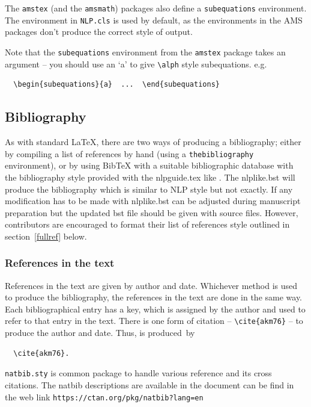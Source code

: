 \documentclass{CUP-JNL-NLP}
\begin{document}
The \verb"amstex" (and the \verb"amsmath") packages also define a
\verb"subequations" environment.  The environment in \verb"NLP.cls" is used
by default, as the environments in the AMS packages don't produce the correct
style of output.

Note that the \verb"subequations" environment from the \verb"amstex" package
takes an argument -- you should use an `a' to give \verb"\alph" style
subequations. e.g.
\begin{verbatim}
  \begin{subequations}{a}  ...  \end{subequations}
\end{verbatim}

\subsection{Bibliography}

As with standard \LaTeX, there are two ways of producing a bibliography;
either by compiling a list of references by hand (using a
\verb"thebibliography" environment), or by using BibTeX with a suitable
bibliographic database with the bibliography style provided with the nlpguide.tex like \verb"". The nlplike.bst will produce the bibliography which is similar to NLP style but not exactly. If any modification has to be made with nlplike.bst can be adjusted during manuscript preparation but the updated bst file should be given with source files. However, contributors are encouraged to format
their list of references style outlined in section~\ref{fullref}
below.

\subsubsection{References in the text}

References in the text are given by author and date.
Whichever method is used to produce the bibliography, the references in
the text are done in the same way. Each bibliographical entry has a key,
which is assigned by the author and used to refer to that entry in the
text. There is one form of citation -- \verb"\cite{akm76}" -- to produce the
author and date. Thus, \cite{akm76} is produced~by
\begin{verbatim}
  \cite{akm76}.
\end{verbatim}

\verb"natbib.sty" is common package to handle various reference and its cross citations. The natbib descriptions are available in the document can be find in the web link \verb"https://ctan.org/pkg/natbib?lang=en"
\end{document}

